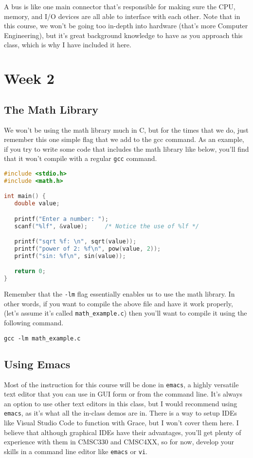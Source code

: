 \documentclass[english, 10pt]{article}
\begin{document}
A bus is like one main connector that's responsible for making sure the CPU, memory, and I/O devices are all able to interface with each other.\newline\newline
Note that in this course, we won't be going too in-depth into hardware (that's more Computer Engineering), but it's great background knowledge to have as you approach this class, which is why I have included it here.

\section{Week 2}

\subsection{The Math Library}

We won't be using the math library much in C, but for the times that we do, just remember this one simple flag that we add to the gcc command. As an example, if you try to write some code that includes the math library like below, you'll find that it won't compile with a regular \texttt{gcc} command. 

{\centering
\begin{lstlisting}[language=C]
#include <stdio.h>
#include <math.h>

int main() {
   double value;

   printf("Enter a number: ");
   scanf("%lf", &value);     /* Notice the use of %lf */

   printf("sqrt %f: \n", sqrt(value));
   printf("power of 2: %f\n", pow(value, 2));
   printf("sin: %f\n", sin(value));

   return 0;
}
\end{lstlisting}
}

Remember that the \texttt{-lm} flag essentially enables us to use the math library. In other words, if you want to compile the above file and have it work properly, (let's assume it's called \texttt{math\_example.c}) then you'll want to compile it using the following command.\newline

\texttt{gcc -lm math\_example.c}

\subsection{Using Emacs}

Most of the instruction for this course will be done in \texttt{emacs}, a highly versatile text editor that you can use in GUI form or from the command line. It's always an option to use other text editors in this class, but I would recommend using \texttt{emacs}, as it's what all the in-class demos are in. There is a way to setup IDEs like Visual Studio Code to function with Grace, but I won't cover them here. I believe that although graphical IDEs have their advantages, you'll get plenty of experience with them in CMSC330 and CMSC4XX, so for now, develop your skills in a command line editor like \texttt{emacs} or \texttt{vi}.\newline
\end{document}
